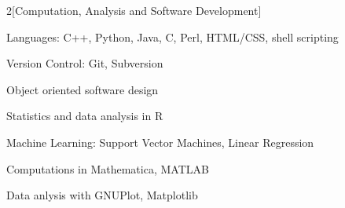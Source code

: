 \documentclass[11pt]{article}
\begin{document}
\begin{multicols}{2}[Computation, Analysis and Software Development]
\begin{compactitem}
\item Languages: C++, Python, Java, C, Perl, HTML/CSS, shell scripting
\item Version Control: Git, Subversion 
\item Object oriented software design
\item Statistics and data analysis in R
\item Machine Learning: Support Vector Machines, Linear Regression
\item Computations in Mathematica, MATLAB
\item Data anlysis with GNUPlot, Matplotlib 
\end{compactitem} 
\end{multicols}
\end{document}
